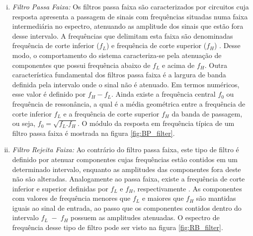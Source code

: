 \begin{enumerate}[i),leftmargin=1.75cm,itemindent=0cm]
	\item 
	\textit{Filtro Passa Faixa:} Os filtros passa faixa são caracterizados por circuitos cuja resposta apresenta a passagem de sinais com frequências situadas numa faixa intermediária no espectro, atenuando as amplitude dos sinais que estão fora desse intervalo. A frequências que delimitam esta faixa são denominadas frequência de corte inferior ($f_L$) e frequência de corte superior ($f_H$) \cite{Mussoi2004}. Desse modo, o comportamento do sistema caracteriza-se pela atenuação de componentes que possui frequência abaixo de $f_L$ e acima de $f_H$. Outra característica fundamental dos filtros passa faixa é a largura de banda definida pela intervalo onde o sinal não é atenuado. Em termos numéricos, esse valor é definido por $f_H-f_L$. Ainda existe a frequência central $f_0$ ou frequência de ressonância, a qual é a média geométrica entre a frequência de corte inferior $f_L$ e a frequência de corte superior $f_H$ da banda de passagem, ou seja, $f_0=\sqrt{f_L.f_H}$. O módulo da resposta em frequência típica de um filtro passa faixa é mostrada na figura \ref{fig:BP_filter}.
		
	\item 
	\textit{Filtro Rejeita Faixa:} Ao contrário do filtro passa faixa, este tipo de filtro é definido por atenuar componentes cujas frequências estão contidos em um determinado intervalo, enquanto as amplitudes das componentes fora deste não são alteradas.  Analogamente ao passa faixa, existe a frequência de corte inferior e superior definidas por $f_L$ e $f_H$, respectivamente \cite{Mussoi2004}. As componentes com valores de frequência menores que $f_L$ e maiores que $f_H$ são mantidas iguais ao sinal de entrada, ao passo que os componentes contidos dentro do intervalo $f_L\;-\;f_H$ possuem as amplitudes atenuadas. O espectro de frequência desse tipo de filtro pode ser visto na figura \ref{fig:RB_filter}.
		

\end{enumerate}
